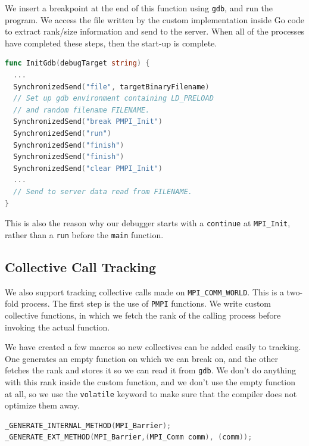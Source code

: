 \documentclass[10pt,conference]{IEEEtran}
\begin{document}
We insert a breakpoint at the end of this function using \texttt{gdb}, and run the program. We access the file written by the custom implementation inside Go code to extract rank/size information and send to the server. When all of the processes have completed these steps, then the start-up is complete.

\begin{samepage}
  \begin{lstlisting}[language=Go, caption=gdb.go: InitGdb]
func InitGdb(debugTarget string) {
  ...
  SynchronizedSend("file", targetBinaryFilename)
  // Set up gdb environment containing LD_PRELOAD
  // and random filename FILENAME.
  SynchronizedSend("break PMPI_Init")
  SynchronizedSend("run")
  SynchronizedSend("finish")
  SynchronizedSend("finish")
  SynchronizedSend("clear PMPI_Init")
  ...
  // Send to server data read from FILENAME.
}
\end{lstlisting}
\end{samepage}

This is also the reason why our debugger starts with a \texttt{continue} at \texttt{MPI\_Init}, rather than a \texttt{run} before the \texttt{main} function.

\subsection{Collective Call Tracking}

We also support tracking collective calls made on \texttt{MPI\_COMM\_WORLD}. This is a two-fold process. The first step is the use of \texttt{PMPI} functions. We write custom collective functions, in which we fetch the rank of the calling process before invoking the actual function.

We have created a few macros so new collectives can be added easily to tracking. One generates an empty function on which we can break on, and the other fetches the rank and stores it so we can read it from \texttt{gdb}. We don't do anything with this rank inside the custom function, and we don't use the empty function at all, so we use the \texttt{volatile} keyword to make sure that the compiler does not optimize them away.

\begin{samepage}
\begin{lstlisting}[language=C, caption=Collective call instrumentation]
_GENERATE_INTERNAL_METHOD(MPI_Barrier);
_GENERATE_EXT_METHOD(MPI_Barrier,(MPI_Comm comm), (comm));
\end{lstlisting}
\end{samepage}
\end{document}
